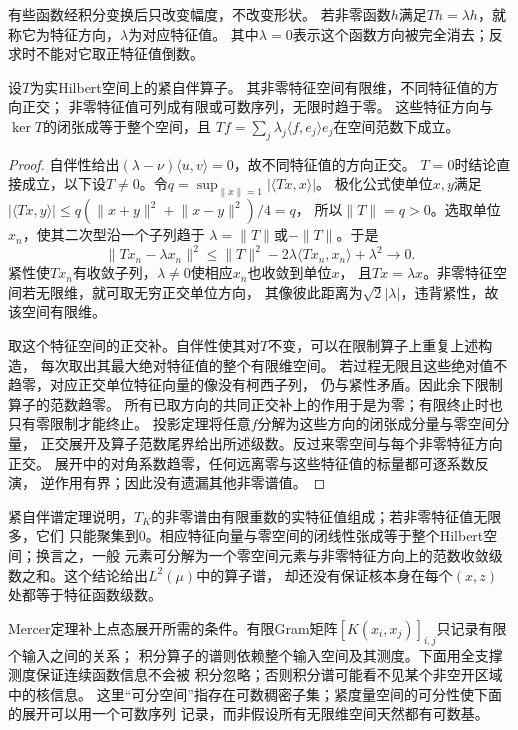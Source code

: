 有些函数经积分变换后只改变幅度，不改变形状。
若非零函数$h$满足$Th=\lambda h$，就称它为特征方向，$\lambda$为对应特征值。
其中$\lambda=0$表示这个函数方向被完全消去；反求时不能对它取正特征值倒数。


\begin{theorem}[紧自伴算子的正交分解]
\label{thm:functional-compact-selfadjoint-spectrum}
设$T$为实Hilbert空间上的紧自伴算子。
其非零特征空间有限维，不同特征值的方向正交；
非零特征值可列成有限或可数序列，无限时趋于零。
这些特征方向与$\ker T$的闭张成等于整个空间，且
$Tf=\sum_j\lambda_j\langle f,e_j\rangle e_j$在空间范数下成立。
\end{theorem}
\begin{proof}
自伴性给出$(\lambda-\nu)\langle u,v\rangle=0$，故不同特征值的方向正交。
$T=0$时结论直接成立，以下设$T\neq0$。令$q=\sup_{\lVert x\rVert=1}|\langle Tx,x\rangle|$。
极化公式使单位$x,y$满足
$|\langle Tx,y\rangle|\leq q(\lVert x+y\rVert^2+\lVert x-y\rVert^2)/4=q$，
所以$\lVert T\rVert=q>0$。选取单位$x_n$，使其二次型沿一个子列趋于
$\lambda=\lVert T\rVert$或$-\lVert T\rVert$。于是
\[
 \lVert Tx_n-\lambda x_n\rVert^2
 \leq\lVert T\rVert^2-2\lambda\langle Tx_n,x_n\rangle+\lambda^2\to0.
\]
紧性使$Tx_n$有收敛子列，$\lambda\neq0$使相应$x_n$也收敛到单位$x$，
且$Tx=\lambda x$。非零特征空间若无限维，就可取无穷正交单位方向，
其像彼此距离为$\sqrt2|\lambda|$，违背紧性，故该空间有限维。

取这个特征空间的正交补。自伴性使其对$T$不变，可以在限制算子上重复上述构造，
每次取出其最大绝对特征值的整个有限维空间。
若过程无限且这些绝对值不趋零，对应正交单位特征向量的像没有柯西子列，
仍与紧性矛盾。因此余下限制算子的范数趋零。
所有已取方向的共同正交补上的作用于是为零；有限终止时也只有零限制才能终止。
投影定理将任意$f$分解为这些方向的闭张成分量与零空间分量，
正交展开及算子范数尾界给出所述级数。反过来零空间与每个非零特征方向正交。
展开中的对角系数趋零，任何远离零与这些特征值的标量都可逐系数反演，
逆作用有界；因此没有遗漏其他非零谱值。
\end{proof}
紧自伴谱定理说明，$T_K$的非零谱由有限重数的实特征值组成；若非零特征值无限多，它们
只能聚集到$0$。相应特征向量与零空间的闭线性张成等于整个Hilbert空间；换言之，一般
元素可分解为一个零空间元素与非零特征方向上的范数收敛级数之和。这个结论给出$L^2(\mu)$中的算子谱，
却还没有保证核本身在每个$(x,z)$处都等于特征函数级数。

Mercer定理补上点态展开所需的条件。有限Gram矩阵$[K(x_i,x_j)]_{i,j}$只记录有限个输入之间的关系；
积分算子的谱则依赖整个输入空间及其测度。下面用全支撑测度保证连续函数信息不会被
积分忽略；否则积分谱可能看不见某个非空开区域中的核信息。
这里“可分空间”指存在可数稠密子集；紧度量空间的可分性使下面的展开可以用一个可数序列
记录，而非假设所有无限维空间天然都有可数基。

